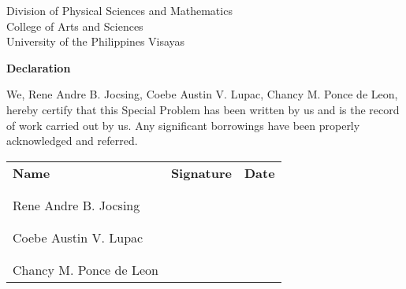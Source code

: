 \begin{center}
	Division of Physical Sciences and Mathematics\\
	College of Arts and Sciences\\
	University of the Philippines Visayas

		\textbf{Declaration}
		\end{center}

We,  Rene Andre B. Jocsing, Coebe Austin V. Lupac, Chancy M. Ponce de Leon, hereby certify that this Special Problem has been written by us  and is the record of work carried out by us. Any significant borrowings have been properly acknowledged and referred.

	\begin{tabular}{lll}
	\bfseries Name  & \bfseries Signature & \bfseries Date\\ \\
	\signaturerule &\signaturerule  & \signaturerule\\
	Rene Andre B. Jocsing\\ \\
	\signaturerule &\signaturerule &\signaturerule\\
	Coebe Austin V. Lupac\\ \\
	\signaturerule &\signaturerule &\signaturerule\\
	Chancy M. Ponce de Leon
\end{tabular}

